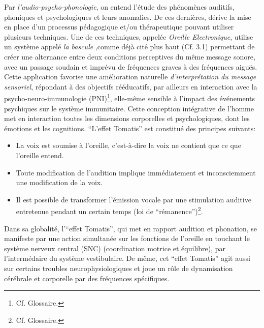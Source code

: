 Par {\textit{l'audio-psycho-phonologie}}, on entend l'étude des
phénomènes auditifs, phoniques et psychologiques et leurs anomalies.
De ces dernières,  dérive la mise en place d'un processus pédagogique
et/ou thérapeutique pouvant
utiliser plusieurs techniques.
Une de ces techniques,
  appelée
\label{outil_oreille_electro}
\textit{Oreille Electronique}, utilise
un système appelé \textit{ la
bascule} \autocite{escera-key},comme déjà cité plus haut (Cf. 3.1) permettant de créer une alternance 
entre deux conditions perceptives
du même message sonore, avec un passage soudain et imprévu de fréquences graves à des
fréquences aiguës.
Cette application favorise une amélioration naturelle \emph{d'interprétation du message
sensoriel}, répondant à des objectifs rééducatifs, par ailleurs en
interaction avec la psycho-neuro-immunologie (\gls{PNI})\footnote{Cf. Glossaire.}, elle-même sensible à
l'impact des événements psychiques sur le système immunitaire.
Cette conception intégrative de l'homme met en interaction toutes les
dimensions corporelles et psychologiques, dont les émotions et les cognitions.
``L'effet Tomatis''  est constitué des principes suivants:
\begin{itemize}
	\item La voix est soumise à l'oreille, c'est-à-dire la voix ne contient que ce que l'oreille entend.
	\item Toute modification de l'audition implique immédiatement
          et inconsciemment une
          modification de la voix.
	\item Il est possible de transformer l'émission vocale par une stimulation
auditive
		entretenue pendant un certain temps (loi de
               ``\gls{rémanence}'')\footnote{Cf. Glossaire.}.

\end{itemize}
Dans sa globalité, l'``effet Tomatis'', qui met en rapport audition et phonation, se manifeste par une 
action
simultanée sur les fonctions de
l'oreille en touchant le système nerveux central (SNC) (coordination
                motrice et équilibre), par l'intermédaire du système
                vestibulaire.
                De même, cet ``effet Tomatis'' agit aussi sur certains troubles
                neurophysiologiques et  joue un rôle de dynamisation cérébrale et corporelle
                par des fréquences spécifiques.


